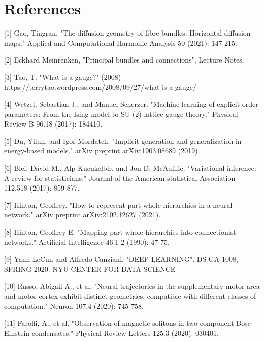 \documentclass{article}
\begin{document}
\newpage
\section*{References}

\small

[1] Gao, Tingran. "The diffusion geometry of fibre bundles: Horizontal diffusion maps." Applied and Computational Harmonic Analysis 50 (2021): 147-215.

[2] Eckhard Meinrenken, "Principal bundles and connections", Lecture Notes. 

[3] Tao, T. "What is a gauge?" (2008) https://terrytao.wordpress.com/2008/09/27/what-is-a-gauge/

[4] Wetzel, Sebastian J., and Manuel Scherzer. "Machine learning of explicit order parameters: From the Ising model to SU (2) lattice gauge theory." Physical Review B 96.18 (2017): 184410.


[5] Du, Yilun, and Igor Mordatch. "Implicit generation and generalization in energy-based models." arXiv preprint arXiv:1903.08689 (2019).

[6] Blei, David M., Alp Kucukelbir, and Jon D. McAuliffe. "Variational inference: A review for statisticians." Journal of the American statistical Association 112.518 (2017): 859-877.


[7] Hinton, Geoffrey. "How to represent part-whole hierarchies in a neural network." arXiv preprint arXiv:2102.12627 (2021).

[8] Hinton, Geoffrey E. "Mapping part-whole hierarchies into connectionist networks." Artificial Intelligence 46.1-2 (1990): 47-75.

[9]  Yann LeCun  and Alfredo Canziani. "DEEP LEARNING". DS-GA 1008, SPRING 2020. NYU CENTER FOR DATA SCIENCE

[10] Russo, Abigail A., et al. "Neural trajectories in the supplementary motor area and motor cortex exhibit distinct geometries, compatible with different classes of computation." Neuron 107.4 (2020): 745-758.

[11] Farolfi, A., et al. "Observation of magnetic solitons in two-component Bose-Einstein condensates." Physical Review Letters 125.3 (2020): 030401.
\end{document}
